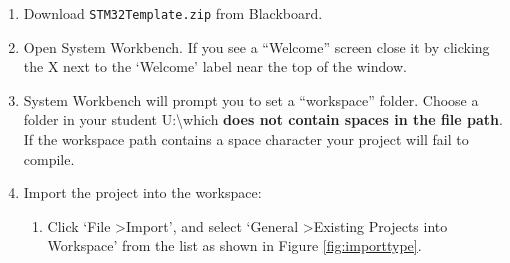 \documentclass{UoNMCHA}
\numberwithin{equation}{section}
\begin{document}
\begin{enumerate}
    \item Download \texttt{STM32Template.zip} from Blackboard.
    
    \item Open System Workbench. If you see a ``Welcome'' screen close it by clicking the X next to the `Welcome' label near the top of the window.
    
    \item System Workbench will prompt you to set a ``workspace'' folder. Choose a folder in your student U:\textbackslash which \textbf{does not contain spaces in the file path}. If the workspace path contains a space character your project will fail to compile.
    
    \begin{figure}[H]
    \centering
    \end{figure}
    
    \item Import the project into the workspace:
    \begin{enumerate}
        \item Click `File \textgreater Import', and select `General \textgreater Existing Projects into Workspace' from the list as shown in Figure \ref{fig:importtype}.
    

\end{enumerate}
\end{enumerate}
\end{document}
